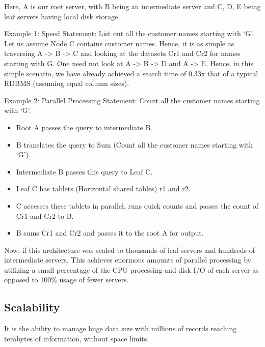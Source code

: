 \documentclass[9pt,twocolumn,twoside]{../../styles/osajnl}
\begin{document}
\noindent
Here, A is our root server, with B being an intermediate server and C,
D, E being leaf servers having local disk storage.\newline

\noindent
Example 1: Speed \newline
Statement: List out all the customer names starting with ‘G’.\newline
\noindent
Let us assume Node C contains customer names.  Hence, it is as simple
as traversing A -> B -> C and looking at the datasets Cr1 and Cr2 for
names starting with G. One need not look at A -> B -> D and A ->
E. Hence, in this simple scenario, we have already achieved a search
time of 0.33x that of a typical RDBMS \CE (assuming equal column sizes).\newline

\noindent
Example 2: Parallel Processing \newline
Statement: Count all the customer names
starting with ‘G’. \newline

\begin{itemize}[noitemsep,topsep=0pt]
\item Root A passes the query to intermediate B. \item B translates
  the query to Sum (Count all the customer names starting with
  ‘G’). \item Intermediate B passes this query to Leaf C. \item Leaf C
  has tablets (Horizontal shared tables) r1 and r2. \item C accesses
  these tablets in parallel, runs quick counts and passes the count of
  Cr1 and Cr2 to B. \item B sums Cr1 and Cr2 and passes it to the root
  A for output. \end{itemize}

\noindent
Now, if this architecture was scaled to thousands of leaf servers and
hundreds of intermediate servers. This achieves enormous amounts of
parallel processing by utilizing a small percentage of the CPU
processing and disk I/O of each server as opposed to 100\% usage of
fewer servers.
\subsection{Scalability}
It is the ability to manage huge data size with millions of records
reaching terabytes of information, without space limits\cite{www-bigquery}.
\end{document}
